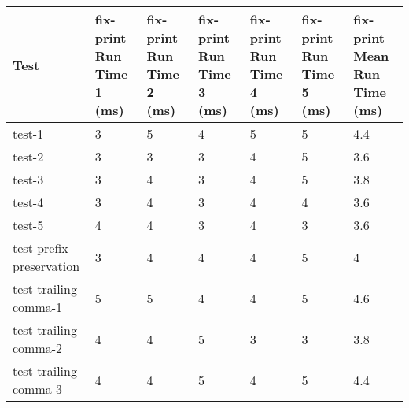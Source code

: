 \begin{table}[h!]
    \centering
    \begin{tabular}{@{}l|p{5em}p{5em}p{5em}p{5em}p{5em}p{5em}@{}}
    \toprule
    Test                                  & fix-print Run Time 1 (ms) & fix-print Run Time 2 (ms) & fix-print Run Time 3 (ms) & fix-print Run Time 4 (ms) & fix-print Run Time 5 (ms) & fix-print Mean Run Time (ms) \\ \midrule
    test-1                               & 3                          & 5                          & 4                          & 5                          & 5                          & 4.4                              \\
    test-2                               & 3                          & 3                          & 3                          & 4                          & 5                          & 3.6                              \\
    test-3                               & 3                          & 4                          & 3                          & 4                          & 5                          & 3.8                              \\
    test-4                               & 3                          & 4                          & 3                          & 4                          & 4                          & 3.6                              \\
    test-5                               & 4                          & 4                          & 3                          & 4                          & 3                          & 3.6                              \\
    test-prefix-preservation            & 3                          & 4                          & 4                          & 4                          & 5                          & 4                                \\
    test-trailing-comma-1              & 5                          & 5                          & 4                          & 4                          & 5                          & 4.6                              \\
    test-trailing-comma-2              & 4                          & 4                          & 5                          & 3                          & 3                          & 3.8                              \\
    test-trailing-comma-3              & 4                          & 4                          & 5                          & 4                          & 5                          & 4.4                              \\

\end{tabular}
\end{table}
